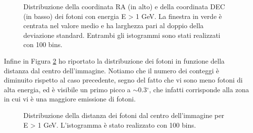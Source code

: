 \documentclass[a4paper,twocolumn]{article}
\begin{document}
\begin{large}
\begin{figure}[h]
    \caption{\small Distribuzione della coordinata RA (in alto) e della coordinata DEC (in basso) dei fotoni con energia E > 1 GeV. La finestra in verde è centrata nel valore medio e ha larghezza pari al doppio della deviazione standard. Entrambi gli istogrammi sono stati realizzati con 100 bins.}
    \label{c_dist1}
\end{figure}
 
\noindent
Infine in Figura \ref{d1G} ho riportato la distribuzione dei fotoni in funzione della distanza dal centro dell'immagine. Notiamo che il numero dei conteggi è diminuito rispetto al caso precedente, segno del fatto che vi sono meno fotoni di alta energia, ed è visibile un primo picco a $\sim$0.3$^{\circ}$, che infatti corrisponde alla zona in cui vi è una maggiore emissione di fotoni.

\begin{figure}[h]
    \caption{\small Distribuzione della distanza dei fotoni dal centro dell'immagine per E > 1 GeV. L'istogramma è stato realizzato con 100 bins.}
    \label{d1G}
\end{figure}



\end{large}
\end{document}

